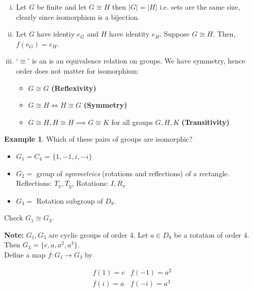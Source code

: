 \documentclass{article}
\theoremstyle{definition} \newtheorem*{definition}{Definition}
\newtheorem*{exmp}{Example} \newtheorem*{exmps}{Examples}
\newcommand{\ism}{\cong} \newcommand{\elemt}[2]{#1_{{#2}\sigma(#2)}}
\begin{document}
\begin{remark}\hfill \begin{enumerate}[(i)] \item Let $G$ be finite and let $G \ism
        H$ then $|G|=|H|$ i.e. sets are the same size, clearly since
      isomorphism is a bijection.  \item Let $G$ have identiy $e_G$ and $H$
        have identity $e_H$. Suppose $G \ism H$. Then, $f(e_G)=e_H$.  \item
        `$\ism$' is an is an equivalence relation on groups.  We have symmetry,
      hence order does not matter for isomorphism: \begin{itemize} \item$G \ism
            G $ \textbf{(Reflexivity)} \item$G \ism H \iff H \ism G$
            \textbf{(Symmetry)} \item $G \ism H, H \ism H \implies G \ism K $
              for all groups $G,H,K$\textbf{ (Transitivity)}\\ \end{itemize}
      \end{enumerate} \end{remark}

\begin{exmp} Which of these pairs of groups are isomorphic?  \begin{itemize}
      \item $G_1 = C_4$ = $\{1,-1,i,-i\}$ \item $G_2 = $ group of
        \emph{symmetrics} (rotations and reflections) of a rectangle.\\
        Reflections: $T_x, T_y$, Rotations: $I, R_\pi$ \item $G_3 = $ Rotation
          subgroup of $D_8$.  \end{itemize}
  
Check $G_1 \ism G_3$.  \end{exmp}

\textbf{Note:} $G_1, G_3$ are cyclic groups of order 4. Let $a \in D_8$ be a
rotation of order 4.  Then $G_3 = \{e,a,a^2, a^3\}$.\hfill\\

Define a map $f:G_1 \rightarrow G_3$ by 

\begin{equation*} \begin{matrix} f(1)=e & f(-1) = a^2 \\ f(i)=a & f(-i) = a^3
  \end{matrix} \label{} \end{equation*}
\end{document}
